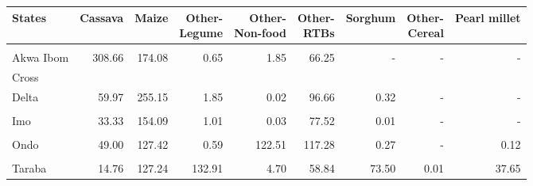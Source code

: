 \begin{table}[!h]
\centering\begingroup\fontsize{7}{9}\selectfont

\begin{tabular}{>{\raggedright\arraybackslash}p{1.8cm}rrrrrrrr}
\toprule
States & Cassava & Maize & \makecell{Other-\\Legume} & \makecell{Other-\\Non-food} & \makecell{Other-\\RTBs} & Sorghum & \makecell{Other-\\Cereal} & Pearl millet\\
\midrule
\cellcolor{gray!10}{Abia} & \cellcolor{gray!10}{76.46} & \cellcolor{gray!10}{163.83} & \cellcolor{gray!10}{6.27} & \cellcolor{gray!10}{3.94} & \cellcolor{gray!10}{82.83} & \cellcolor{gray!10}{0.05} & \cellcolor{gray!10}{-} & \cellcolor{gray!10}{-}\\
Akwa Ibom & 308.66 & 174.08 & 0.65 & 1.85 & 66.25 & - & - & -\\
Cross
\cellcolor{gray!10}{River} & \cellcolor{gray!10}{153.33} & \cellcolor{gray!10}{241.78} & \cellcolor{gray!10}{8.31} & \cellcolor{gray!10}{195.92} & \cellcolor{gray!10}{218.37} & \cellcolor{gray!10}{1.03} & \cellcolor{gray!10}{-} & \cellcolor{gray!10}{0.62}\\
Delta & 59.97 & 255.15 & 1.85 & 0.02 & 96.66 & 0.32 & - & -\\
\cellcolor{gray!10}{Enugu} & \cellcolor{gray!10}{-} & \cellcolor{gray!10}{62.91} & \cellcolor{gray!10}{10.20} & \cellcolor{gray!10}{0.01} & \cellcolor{gray!10}{168.83} & \cellcolor{gray!10}{0.18} & \cellcolor{gray!10}{-} & \cellcolor{gray!10}{0.02}\\
\addlinespace
Imo & 33.33 & 154.09 & 1.01 & 0.03 & 77.52 & 0.01 & - & -\\
\cellcolor{gray!10}{Ogun} & \cellcolor{gray!10}{70.45} & \cellcolor{gray!10}{110.71} & \cellcolor{gray!10}{1.97} & \cellcolor{gray!10}{42.61} & \cellcolor{gray!10}{16.05} & \cellcolor{gray!10}{0.28} & \cellcolor{gray!10}{-} & \cellcolor{gray!10}{-}\\
Ondo & 49.00 & 127.42 & 0.59 & 122.51 & 117.28 & 0.27 & - & 0.12\\
\cellcolor{gray!10}{Rivers} & \cellcolor{gray!10}{99.11} & \cellcolor{gray!10}{127.01} & \cellcolor{gray!10}{44.33} & \cellcolor{gray!10}{0.80} & \cellcolor{gray!10}{215.57} & \cellcolor{gray!10}{0.03} & \cellcolor{gray!10}{-} & \cellcolor{gray!10}{-}\\
Taraba & 14.76 & 127.24 & 132.91 & 4.70 & 58.84 & 73.50 & 0.01 & 37.65\\
\bottomrule
\end{tabular}
\endgroup{}
\end{table}
